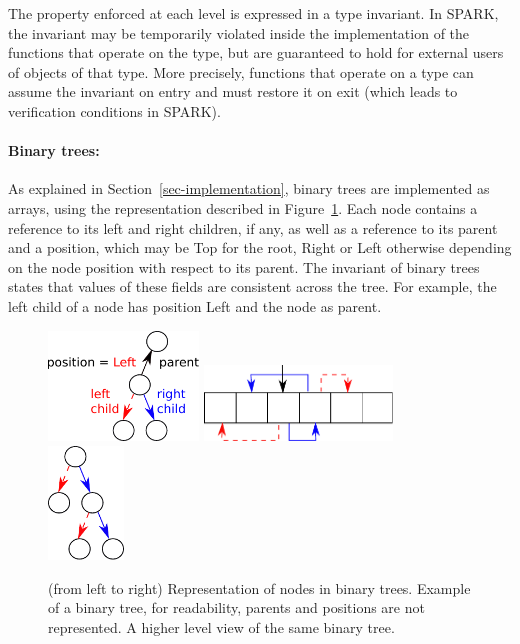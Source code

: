 \documentclass{llncs}
\begin{document}
The property enforced at each level is expressed in a type invariant. In SPARK,
the invariant may be temporarily violated inside the implementation of the
functions that operate on the type, but are guaranteed to hold for external
users of objects of that type. More precisely, functions that operate
on a type can assume the invariant on entry and must restore it on exit (which
leads to verification conditions in SPARK).

\paragraph{Binary trees:}
As explained in Section~\ref{sec-implementation}, binary trees are
implemented as arrays, using the representation described in Figure~\ref{fig-binary}.
Each node contains a reference to its left and right children, if any, as well
as a reference to its parent and a position, which may be Top for the root,
Right or Left otherwise depending on the node position with respect to its
parent. The invariant of binary trees states that values of these fields are
consistent across the tree. For example, the left child of a node has position
Left and the node as parent.

\begin{figure}[ht]
\vspace{-0.5cm}
\begin{center}
\includegraphics[width=4cm]{tree_structure.pdf}\hfill
\includegraphics[width=5cm]{binary_1.pdf}\hfill
\includegraphics[width=2cm]{binary_2.pdf}
\caption{(from left to right) Representation of nodes in binary trees.
Example of a binary tree, for readability, parents and positions are not represented.
A higher level view of the same binary tree.}
\label{fig-binary}
\end{center}
\vspace{-0.5cm}
\end{figure}
\end{document}
